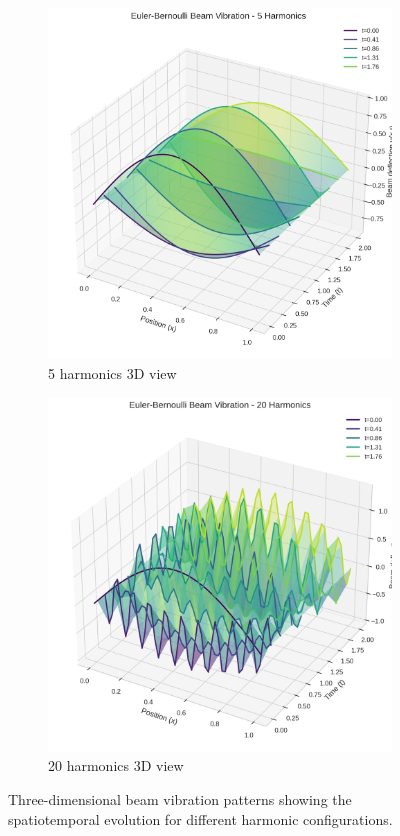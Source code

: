 \begin{figure}[H]
    \centering
    \begin{subfigure}[b]{0.48\textwidth}
        \centering
        \includegraphics[width=\textwidth]{figures/euler_bernoulli_3d_5h.png}
        \caption{5 harmonics 3D view}
    \end{subfigure}
    \hfill
    \begin{subfigure}[b]{0.48\textwidth}
        \centering
        \includegraphics[width=\textwidth]{figures/euler_bernoulli_3d_20h.png}
        \caption{20 harmonics 3D view}
    \end{subfigure}
    \caption{Three-dimensional beam vibration patterns showing the spatiotemporal evolution for different harmonic configurations.}
    \label{fig:beam_3d_comparison}
\end{figure}

